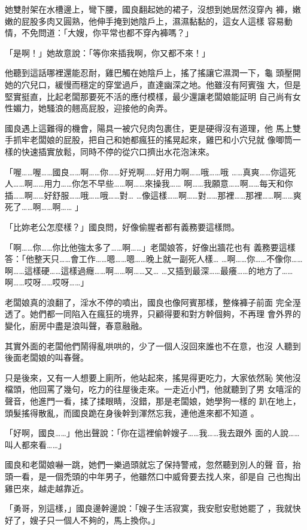 她雙肘架在水槽邊上，彎下腰，國良翻起她的裙子，沒想到她居然沒穿內
褲，嫩嫩的屁股多肉又圓熟，他伸手掩到她陰戶上，濕濕黏黏的，這女人這樣
容易動情，不免問道：「大嫂，你平常也都不穿內褲嗎？」

「是啊！」她故意說：「等你來插我啊，你又都不來！」

他聽到這話哪裡還能忍耐，雞巴觸在她陰戶上，搖了搖讓它濕潤一下，龜
頭壓開她的穴兒口，緩慢而穩定的穿堂過戶，直達幽深之地。他雖沒有阿賓強
大，但是堅實挺直，比起老闆那要死不活的應付模樣，最少還讓老闆娘能証明
自己尚有女性媚力，她騷浪的翹高屁股，迎接他的肏弄。

國良遇上這難得的機會，陽具一被穴兒肉包裹住，更是硬得沒有道理，他
馬上雙手抓牢老闆娘的屁股，把自己和她都瘋狂的搖晃起來，雞巴和小穴兒就
像唧筒一樣的快速插實放鬆，同時不停的從穴口擠出水花泡沫來。

「喔……喔……國良……啊……你……好兇啊……好用力啊……哦……哦
……真爽……你這死人……啊……用力……你怎不早些……啊……來操我……
啊……我願意……啊……每天和你插……啊……好舒服……哦……哦……對…
…像這樣……啊……對……那裡……那裡……啊……爽死了……啊……啊……
」

「比妳老公怎麼樣？」國良問，好像偷腥者都有義務要這樣問。

「啊……你……你比他強太多了……啊……」老闆娘答，好像出牆花也有
義務要這樣答：「他整天只……會工作……嗯……嗯……晚上就一副死人樣…
…啊……你……不像你……啊……這樣硬……這樣過癮……啊……啊……又…
…又插到最深……最癢……的地方了……啊……哎呀……哎呀……」

老闆娘真的浪翻了，淫水不停的噴出，國良也像阿賓那樣，整條褲子前面
完全溼透了。她們都一同陷入在瘋狂的境界，只顧得要和對方幹個夠，不再理
會外界的變化，廚房中盡是浪叫聲，春意融融。

其實外面的老闆他們鬧得亂哄哄的，少了一個人沒回來誰也不在意，也沒
人聽到後面老闆娘的叫春聲。

只是後來，又有一人想要上廁所，他站起來，搖晃得更吃力，大家依然恥
笑他沒檔頭，他回罵了幾句，吃力的往屋後走來。一走近小門，他就聽到了男
女嘻淫的聲音，他進門一看，揉了揉眼睛，沒錯，那是老闆娘，她學狗一樣的
趴在地上，頭髮搖得散亂，而國良跪在身後幹到渾然忘我，連他進來都不知道
。

「好啊，國良……」他出聲說：「你在這裡偷幹嫂子……我……我去跟外
面的人說……叫人都來看……」

國良和老闆娘嚇一跳，她們一樂過頭就忘了保持警戒，忽然聽到別人的聲
音，抬頭一看，是一個禿頭的中年男子，他雖然口中威脅要去找人來，卻是自
己也掏出雞巴來，越走越靠近。

「勇哥，別這樣，」國良邊幹邊說：「嫂子生活寂寞，我安慰安慰她罷了
，我就快好了，嫂子只一個人不夠的，馬上換你。」

